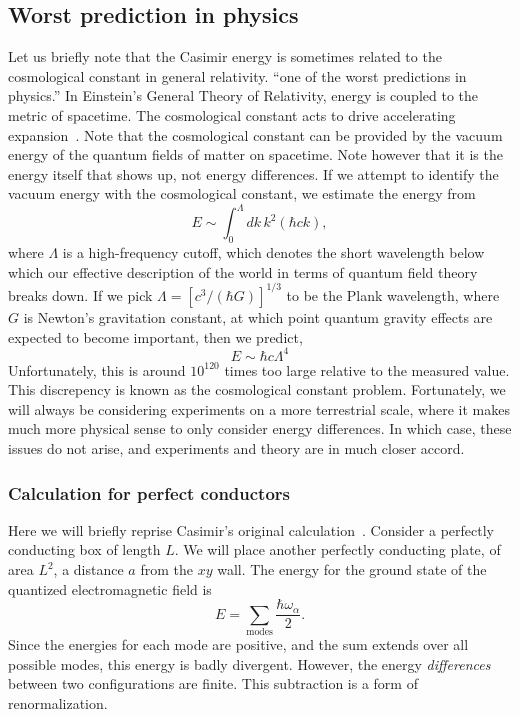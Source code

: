 \subsection{Worst prediction in physics}

Let us briefly note that the Casimir energy is sometimes related to the cosmological constant in general relativity.
  ``one of the worst predictions in physics.''  
In Einstein's General Theory of Relativity, energy is coupled to the metric of spacetime.
  The cosmological constant acts to drive accelerating expansion~\cite{Carroll2004}.
  Note that the cosmological constant can be provided by the vacuum energy of the quantum fields of matter on spacetime.
  Note however that it is the energy itself that shows up, not energy differences. 
If we attempt to identify the vacuum energy with the cosmological constant, we estimate the energy from 
\begin{equation}
E \sim \int_0^\Lambda dk\,k^2 (\hbar c k),
\end{equation}
where $\Lambda$ is a high-frequency cutoff, which denotes the short wavelength
 below which our effective description of the world in terms of quantum 
field theory breaks down.
  If we pick $\Lambda=[c^3/(\hbar G)]^{1/3}$ to be the Plank wavelength, 
where $G$ is Newton's gravitation constant, at which point quantum gravity
 effects are expected to become important, then we predict, 
\begin{equation}
E \sim \hbar c \Lambda^4 
\end{equation}
Unfortunately, this is around $10^{120}$ times too large relative to the 
measured value.  
This discrepency is known as the cosmological constant problem.  
Fortunately, we will always be considering experiments on a more terrestrial scale,
 where it makes much more physical sense to only consider energy differences.
 In which case, these issues do not arise, and experiments and theory are in much closer accord.    


\subsubsection{Calculation for perfect conductors}

Here we will briefly reprise Casimir's original calculation~\cite{Casimir1948}.
  Consider a perfectly conducting box of length $L$.
  We will place another perfectly conducting plate, of area $L^2$, a distance $a$ from the $xy$ wall.   
The energy for the ground state of the quantized electromagnetic field is   
\begin{equation}
E = \sum_{\text{modes}}\frac{\hbar\omega_\alpha}{2}.
\end{equation}
Since the energies for each mode are positive, and the sum extends over all possible modes,
 this energy is badly divergent.
  However, the energy \emph{differences} between two configurations
  are finite.  This subtraction is a form of renormalization.  

